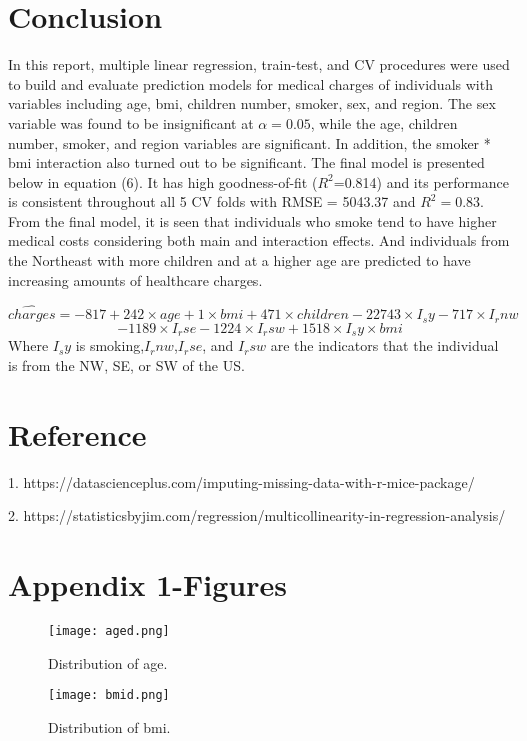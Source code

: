 \documentclass[12pt]{article}
\begin{document}
\section{Conclusion}
In this report, multiple linear regression, train-test, and CV procedures were used to build and evaluate prediction models for medical charges of individuals with variables including age, bmi, children number, smoker, sex, and region. The sex variable was found to be insignificant at $\alpha=0.05$, while the age, children number, smoker, and region variables are significant. In addition, the smoker * bmi interaction also turned out to be significant. The final model is presented below in equation (6). It has high goodness-of-fit ($R^2$=0.814) and its performance is consistent throughout all 5 CV folds with RMSE = 5043.37 and $R^2 = 0.83$. From the final model, it is seen that individuals who smoke tend to have higher medical costs considering both main and interaction effects. And individuals from the Northeast with more children and at a higher age are predicted to have increasing amounts of healthcare charges.	

\begin{equation}
\hat{charges} = -817 + 242\times age +1\times bmi +471\times children - 22743\times I_sy - 717\times I_rnw
\end{equation}
$$- 1189\times I_rse- 1224\times I_rsw+ 1518\times I_sy \times bmi$$
Where $I_sy$ is smoking,$I_rnw$,$I_rse$, and $I_rsw$ are the indicators that the individual is from the NW, SE, or SW of the US.

\section*{Reference}
1. https://datascienceplus.com/imputing-missing-data-with-r-mice-package/
\medskip

2. https://statisticsbyjim.com/regression/multicollinearity-in-regression-analysis/

\newpage 	
\section*{Appendix 1-Figures}	
            \begin{figure}[!htbp]
            \centering
            \texttt{[image: aged.png]}
            \caption{Distribution of age.}
            \label{fig:method}
            \end{figure}

            \begin{figure}[!htbp]
            \centering
            \texttt{[image: bmid.png]}
            \caption{Distribution of bmi.}
            \label{fig:method}
            \end{figure}
            
\end{document}
